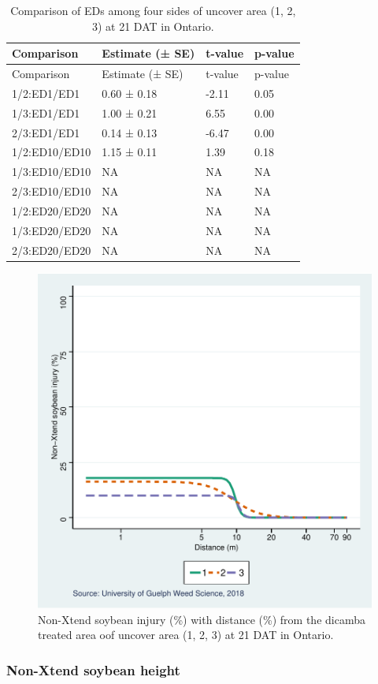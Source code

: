 \documentclass[]{article}
\begin{document}
\begin{longtable}[]{@{}llll@{}}
\caption{Comparison of EDs among four sides of uncover area (1, 2, 3) at
21 DAT in Ontario.}\tabularnewline
\toprule
Comparison & Estimate (± SE) & t-value & p-value\tabularnewline
\midrule
\endfirsthead
\toprule
Comparison & Estimate (± SE) & t-value & p-value\tabularnewline
\midrule
\endhead
1/2:ED1/ED1 & 0.60 ± 0.18 & -2.11 & 0.05\tabularnewline
1/3:ED1/ED1 & 1.00 ± 0.21 & 6.55 & 0.00\tabularnewline
2/3:ED1/ED1 & 0.14 ± 0.13 & -6.47 & 0.00\tabularnewline
1/2:ED10/ED10 & 1.15 ± 0.11 & 1.39 & 0.18\tabularnewline
1/3:ED10/ED10 & NA & NA & NA\tabularnewline
2/3:ED10/ED10 & NA & NA & NA\tabularnewline
1/2:ED20/ED20 & NA & NA & NA\tabularnewline
1/3:ED20/ED20 & NA & NA & NA\tabularnewline
2/3:ED20/ED20 & NA & NA & NA\tabularnewline
\bottomrule
\end{longtable}

\begin{figure}
\centering
\includegraphics{Report_files/figure-latex/ONPlot-1.pdf}
\caption{Non-Xtend soybean injury (\%) with distance (\%) from the
dicamba treated area oof uncover area (1, 2, 3) at 21 DAT in Ontario.}
\end{figure}

\newpage

\pagebreak

\subsubsection{Non-Xtend soybean
height}\label{non-xtend-soybean-height-5}
\end{document}
